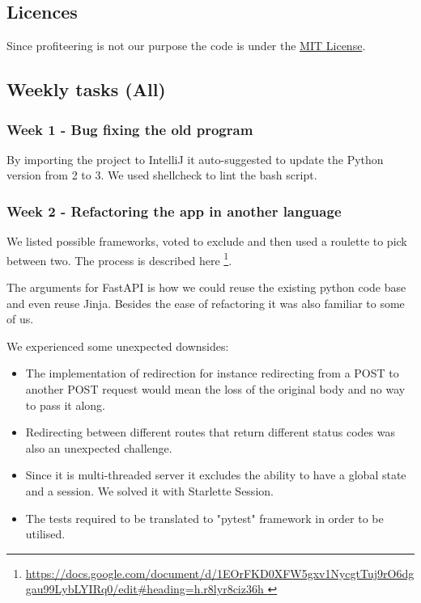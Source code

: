 \documentclass{article}
\begin{document}
\subsection{Licences}

Since profiteering is not our purpose the code is under the \href{https://github.com/MinitwitGroupI/MiniTwit/blob/main/LICENSE}{MIT License}.

\subsection{Weekly tasks (All) }


\subsubsection{Week 1 - Bug fixing the old program}

By importing the project to IntelliJ it auto-suggested to update the Python version from 2 to 3. We used shellcheck to lint the bash script.

\subsubsection{Week 2 - Refactoring the app in another language }

We listed possible frameworks, voted to exclude and then used a roulette to pick between two. The process is described here \footnote{\url{https://docs.google.com/document/d/1EOrFKD0XFW5gxv1NycgtTuj9rO6dggau99LybLYIRq0/edit\#heading=h.r8lyr8ciz36h }}. 

The arguments for FastAPI is how we could reuse the existing python code base and even reuse Jinja. Besides the ease of refactoring it was also familiar to some of us. 

We experienced some unexpected downsides:
\begin{itemize}

    \item The implementation of redirection for instance redirecting from a POST to another POST request would mean the loss of the original body and no way to pass it along. 
    \item Redirecting between different routes that return different status codes was also an unexpected challenge. 
    \item Since it is multi-threaded server it excludes the ability to have a global state and a session. We solved it with Starlette Session.
    \item The tests required to be translated to "pytest" framework in order to be utilised.
\end{itemize}
\end{document}
